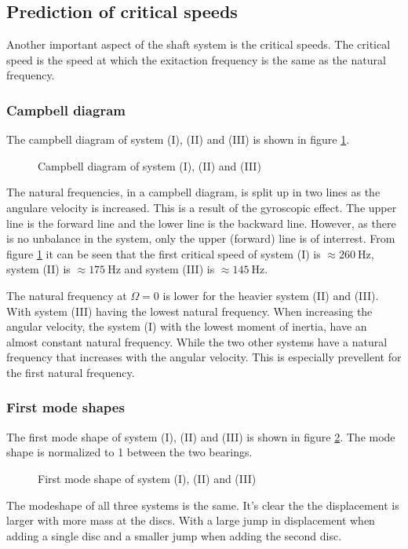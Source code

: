 \subsection{Prediction of critical speeds}
Another important aspect of the shaft system is the critical speeds. The critical speed is the speed at which the exitaction frequency is the same as the natural frequency.

\subsubsection{Campbell diagram}
The campbell diagram of system (I), (II) and (III) is shown in figure \ref{fig:campbell_diagram}.
\begin{figure}[ht]
    \centering
    
    \caption{Campbell diagram of system (I), (II) and (III)}
    \label{fig:campbell_diagram}
\end{figure}
The natural frequencies, in a campbell diagram, is split up in two lines as the angulare velocity is increased. This is a result of the gyroscopic effect. The upper line is the forward line and the lower line is the backward line. However, as there is no unbalance in the system, only the upper (forward) line is of interrest. From figure \ref{fig:campbell_diagram} it can be seen that the first critical speed of system (I) is $\approx \SI{260}{\hertz}$, system (II) is $\approx \SI{175}{\hertz}$ and system (III) is $\approx \SI{145}{\hertz}$.

The natural frequency at $\Omega = 0$ is lower for the heavier system (II) and (III). With system (III) having the lowest natural frequency. When increasing the angular velocity, the system (I) with the lowest moment of inertia, have an almost constant natural frequency. While the two other systems have a natural frequency that increases with the angular velocity. This is especially prevellent for the first natural frequency.

\subsubsection{First mode shapes}
The first mode shape of system (I), (II) and (III) is shown in figure \ref{fig:first_mode_shape}. The mode shape is normalized to 1 between the two bearings.
\begin{figure}[ht]
    \centering
    
    \caption{First mode shape of system (I), (II) and (III)}
    \label{fig:first_mode_shape}
\end{figure}
The modeshape of all three systems is the same. It's clear the the displacement is larger with more mass at the discs. With a large jump in displacement when adding a single disc and a smaller jump when adding the second disc.

